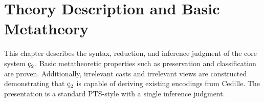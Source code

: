 \chapter{Theory Description and Basic Metatheory}


This chapter describes the syntax, reduction, and inference judgment of the core system $\ced$.
Basic metatheoretic properties such as preservation and classification are proven.
Additionally, irrelevant casts and irrelevant views are constructed demonstrating that $\ced$ is capable of deriving existing encodings from Cedille.
The presentation is a standard PTS-style with a single inference judgment.








